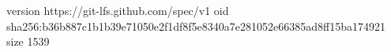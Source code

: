 version https://git-lfs.github.com/spec/v1
oid sha256:b36b887c1b1b39e71050e2f1df8f5e8340a7e281052e66385ad8ff15ba174921
size 1539

